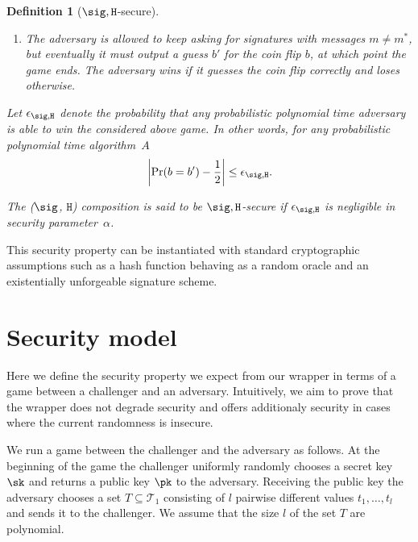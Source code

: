 \documentclass{article}
\newtheorem{definition}[theorem]{Definition}
\begin{document}
{\begin{definition}[$\sig, \texttt{H}$-secure]
\begin{enumerate}
\item The adversary is allowed to keep asking for signatures with messages $m \neq m^*$, but eventually it must output a guess $b'$ for the coin flip $b$, at which point the game ends. The adversary wins if it guesses the coin flip correctly and loses otherwise.
\end{enumerate}

Let $\epsilon_{\sig, \texttt{H}}$ denote the probability that any probabilistic polynomial time adversary is able to win the considered above game. In other words, for any probabilistic polynomial time algorithm~$A$		
$$\left \vert \Pr(b = b') -\frac{1}{2} \right \vert \le \epsilon_{\sig, \texttt{H}}.$$

The  ($\sig$, $\texttt{H}$) composition is said to be $\sig, \texttt{H}$-secure if $\epsilon_{\sig, \texttt{H}}$ is negligible in security parameter~$\alpha$.
\end{definition}


This security property can be instantiated with standard cryptographic assumptions such as a hash function behaving as a random oracle and an existentially unforgeable signature scheme.




\section{Security model} \label{sec:model}

Here we define the security property we expect from our wrapper in terms of a game between a challenger and an adversary. Intuitively, we aim to prove that the wrapper does not degrade security and offers additionaly security in cases where the current randomness is insecure.

We run a game between the challenger and the adversary as follows. At the beginning of the game the challenger uniformly randomly chooses a secret key $\sk$ and returns a public key $\pk$ to the adversary. Receiving the public key the adversary chooses a set $T \subseteq \mathcal{T}_1$ consisting of $l$ pairwise different values $t_1,\ldots,t_l$ and sends it to the challenger.  We assume that the size $l$ of the set $T$ are polynomial. 

% 

}
\end{document}
